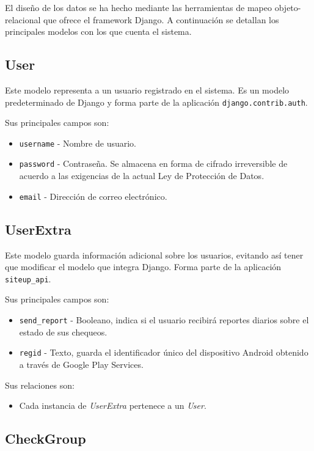 El diseño de los datos se ha hecho mediante las herramientas de mapeo
objeto-relacional que ofrece el framework Django. A continuación se detallan los
principales modelos con los que cuenta el sistema.

\subsection{User}

Este modelo representa a un usuario registrado en el sistema. Es un modelo
predeterminado de Django y forma parte de la aplicación \texttt{django.contrib.auth}.

Sus principales campos son:

\begin{itemize}
\item \texttt{username} - Nombre de usuario.
\item \texttt{password} - Contraseña. Se almacena en forma de cifrado
  irreversible de acuerdo a las exigencias de la actual Ley de Protección de Datos.
\item \texttt{email} - Dirección de correo electrónico.
\end{itemize}

\subsection{UserExtra}

Este modelo guarda información adicional sobre los usuarios, evitando así tener
que modificar el modelo que integra Django. Forma parte de la aplicación \texttt{siteup\_api}.

Sus principales campos son:

\begin{itemize}
\item \texttt{send\_report} - Booleano, indica si el usuario recibirá reportes
  diarios sobre el estado de sus chequeos.
\item \texttt{regid} - Texto, guarda el identificador único del dispositivo
  Android obtenido a través de Google Play Services.
\end{itemize}

Sus relaciones son:
\begin{itemize}
\item Cada instancia de \textit{UserExtra} pertenece a un \textit{User}.
\end{itemize}


\subsection{CheckGroup}

